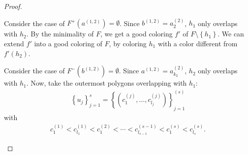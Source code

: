 \documentclass[12pt]{article}
\theoremstyle{definition}
\def\rxhalf{0.5/2}
\def\ryhalf{0.4/2}
\def\rxfourpoint{4.5/2}
\def\ryfourpoint{2.3/2}
\def\rxfivepoint{5.5/2}
\def\ryfivepoint{3.0/2}
\begin{document}
\begin{proof}
\begin{itemize}
\begin{figure}[ht]
\begin{center}
{
             }
             \end{center}
             \caption{}
             \label{figure:t=2}
             \end{figure}
             
             Consider the case of
             $F^{+}\left(a^{\left(1, 2\right)}\right) = \emptyset$.
             Since $b^{\left(1, 2\right)} =
             a_{2}^{\left(2\right)}$, $h_1$ only
             overlaps with $h_2$.
             By the minimality of $F$, 
             we get a good coloring 
             $f'$ of $F \setminus \left\{h_1\right\}$.
             We can extend $f'$ into 
             a good coloring of $F$,
             by coloring $h_1$ with 
             a color different from
             $f'\left(h_2\right)$.

             Consider the case of
             $F^{-}\left(b^{\left(1, 2\right)}\right) = \emptyset$.
             Since $a^{\left(1, 2\right)} = 
             a_{k_2}^{\left(2\right)}$,
             $h_2$ only overlaps with $h_1$.
             Now, take the outermost polygons
             overlapping with $h_1$:
             \begin{gather*}
                 \left\{u_{j}\right\}_{j = 1}^{s} = 
                 \left\{\left(c_1^{\left(j\right)}, \ldots,
                 c_{l_{j}}^{\left(j\right)}\right)\right\}_{j = 1}^{\left(s\right)}
             \end{gather*}
             with
             \begin{gather*}
                 c_1^{\left(1\right)} <
                 c_{l_1}^{\left(1\right)} <
                 c_1^{\left(2\right)} < 
                 \cdots <
                 c_{l_{s-1}}^{\left(s- 1\right)} <
                 c_1^{\left(s\right)} <
                 c_{l_{s}}^{\left(s\right)}.
             \end{gather*}


\end{itemize}
\end{proof}
\end{document}
